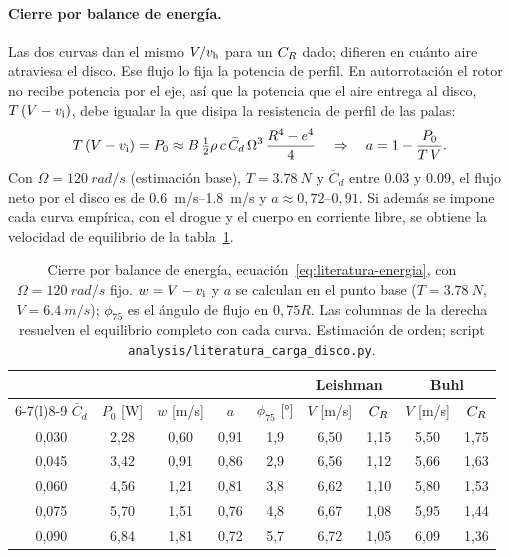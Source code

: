 \paragraph{Cierre por balance de energía.} Las dos curvas dan el mismo $V/v_{\mathrm{h}}$ para un
$C_{R}$ dado; difieren en cuánto aire atraviesa el disco. Ese flujo lo fija la potencia de
perfil. En autorrotación el rotor no recibe potencia por el eje, así que la potencia que
el aire entrega al disco, $T\,(V-v_{\mathrm{i}})$, debe igualar la que disipa la resistencia de
perfil de las palas:
\begin{equation}
  T\,(V-v_{\mathrm{i}})=P_0\approx B\,\tfrac12\rho\,c\,\bar C_d\,\Omega^3\,\frac{R^4-e^4}{4}
  \quad\Rightarrow\quad a=1-\frac{P_0}{T\,V}.
  \label{eq:literatura-energia}
\end{equation}
Con $\Omega=\SI{120}{rad/s}$ (estimación base), $T=\SI{3.78}{N}$ y $\bar C_d$ entre
\num{0.03} y \num{0.09}, el flujo neto por el disco es de \SIrange{0.6}{1.8}{m/s} y
$a\approx0{,}72$--$0{,}91$. Si además se impone cada curva empírica, con el drogue y el
cuerpo en corriente libre, se obtiene la velocidad de equilibrio de la
tabla~\ref{tab:literatura-energia}.

\begin{table}[H]
\centering\small
\caption{Cierre por balance de energía, ecuación~\eqref{eq:literatura-energia}, con
$\Omega=\SI{120}{rad/s}$ fijo. $w=V-v_{\mathrm{i}}$ y $a$ se calculan en el punto base
($T=\SI{3.78}{N}$, $V=\SI{6.4}{m/s}$); $\phi_{75}$ es el ángulo de flujo en $0{,}75R$.
Las columnas de la derecha resuelven el equilibrio completo con cada curva. Estimación de
orden; script \texttt{analysis/literatura\_carga\_disco.py}.}
\label{tab:literatura-energia}
\begin{tabular}{@{}ccccc cc cc@{}}
\toprule
 & & & & & \multicolumn{2}{c}{\textbf{Leishman}} & \multicolumn{2}{c}{\textbf{Buhl}}\\
\cmidrule(lr){6-7}\cmidrule(l){8-9}
$\bar C_d$ & $P_0$ [\si{W}] & $w$ [\si{m/s}] & $a$ & $\phi_{75}$ [\si{\degree}] & $V$ [\si{m/s}] & $C_{R}$ & $V$ [\si{m/s}] & $C_{R}$\\\midrule
0,030 & 2,28 & 0,60 & 0,91 & 1,9 & 6,50 & 1,15 & 5,50 & 1,75\\
0,045 & 3,42 & 0,91 & 0,86 & 2,9 & 6,56 & 1,12 & 5,66 & 1,63\\
0,060 & 4,56 & 1,21 & 0,81 & 3,8 & 6,62 & 1,10 & 5,80 & 1,53\\
0,075 & 5,70 & 1,51 & 0,76 & 4,8 & 6,67 & 1,08 & 5,95 & 1,44\\
0,090 & 6,84 & 1,81 & 0,72 & 5,7 & 6,72 & 1,05 & 6,09 & 1,36\\
\bottomrule
\end{tabular}
\end{table}

